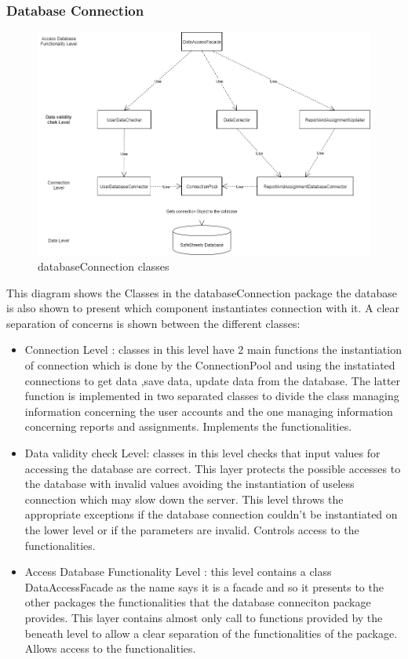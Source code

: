 \subsubsection{ Database Connection}
\begin{figure}[h]
\centering
\includegraphics[width=\textwidth]{Images/databaseConnection.png}
\caption{\label{fig:pK} databaseConnection classes}
\end{figure}
This diagram shows the Classes in the databaseConnection package the database is also shown to present which component instantiates connection with it. A clear separation of concerns is shown between the different classes:
\begin{itemize}
\item Connection Level : classes in this level have 2 main functions the instantiation of connection which is done by the ConnectionPool and using the instatiated connections to get data ,save data, update data from the database.
The latter function is implemented in two separated classes to divide the class managing information concerning the user accounts and the one managing information concerning reports and assignments.
Implements the functionalities.
\item Data validity check Level: classes in this level checks that input values for accessing the database are correct. This layer protects the possible accesses to the database with invalid values avoiding the instantiation of useless connection which may slow down the server. This level throws the appropriate exceptions if the database connection couldn't be instantiated on the lower level or if the parameters are invalid.
Controls access to the functionalities.
\item Access Database Functionality Level : this level contains a class DataAccessFacade as the name says it is a facade and so it presents to the other packages the functionalities that the database conneciton package provides. This layer contains almost only call to functions provided by the beneath level to allow a clear separation of the functionalities of the package.
Allows access to the functionalities.
\end{itemize}
\clearpage
